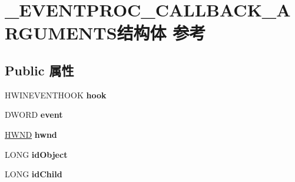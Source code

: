 \hypertarget{struct___e_v_e_n_t_p_r_o_c___c_a_l_l_b_a_c_k___a_r_g_u_m_e_n_t_s}{}\section{\+\_\+\+E\+V\+E\+N\+T\+P\+R\+O\+C\+\_\+\+C\+A\+L\+L\+B\+A\+C\+K\+\_\+\+A\+R\+G\+U\+M\+E\+N\+T\+S结构体 参考}
\label{struct___e_v_e_n_t_p_r_o_c___c_a_l_l_b_a_c_k___a_r_g_u_m_e_n_t_s}
\subsection*{Public 属性}
\begin{DoxyCompactItemize}
\item 
\mbox{\label{struct___e_v_e_n_t_p_r_o_c___c_a_l_l_b_a_c_k___a_r_g_u_m_e_n_t_s_a8b475c75b5534d779b78e55ad552e231}} 
H\+W\+I\+N\+E\+V\+E\+N\+T\+H\+O\+OK {\bfseries hook}
\item 
\mbox{\label{struct___e_v_e_n_t_p_r_o_c___c_a_l_l_b_a_c_k___a_r_g_u_m_e_n_t_s_a7c0995399333e3a7eec86e817ffeb94a}} 
D\+W\+O\+RD {\bfseries event}
\item 
\mbox{\label{struct___e_v_e_n_t_p_r_o_c___c_a_l_l_b_a_c_k___a_r_g_u_m_e_n_t_s_a54e738719856969eb36e215d7f87f84f}} 
\hyperlink{interfacevoid}{H\+W\+ND} {\bfseries hwnd}
\item 
\mbox{\label{struct___e_v_e_n_t_p_r_o_c___c_a_l_l_b_a_c_k___a_r_g_u_m_e_n_t_s_afd63833a56881af172794cc026b59aba}} 
L\+O\+NG {\bfseries id\+Object}
\item 
\mbox{\label{struct___e_v_e_n_t_p_r_o_c___c_a_l_l_b_a_c_k___a_r_g_u_m_e_n_t_s_a74c4de2bd44d10f227c3857ccd7b702a}} 
L\+O\+NG {\bfseries id\+Child}
\item 
\mbox{\label{struct___e_v_e_n_t_p_r_o_c___c_a_l_l_b_a_c_k___a_r_g_u_m_e_n_t_s_a0824c6352751906e48c4186e05c160d2}} 

\end{DoxyCompactItemize}
